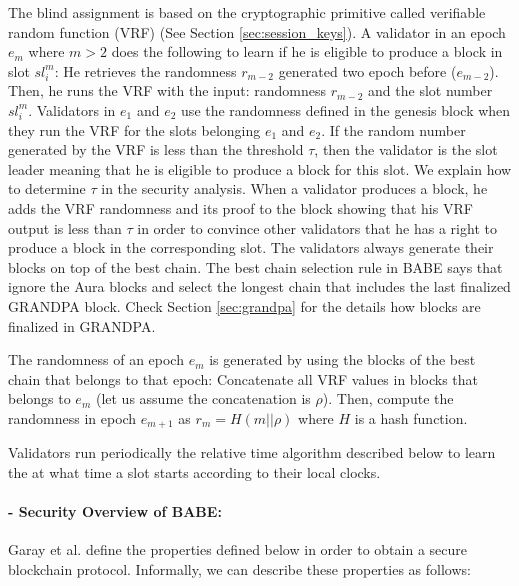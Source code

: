 The blind assignment is based on the cryptographic primitive called verifiable random function (VRF) \cite{vrf} (See Section \ref{sec:session_keys}). 
A validator in an epoch $e_m$ where $m > 2$ does the following to learn if he is eligible to produce a block in slot $sl_i^m$: He retrieves the randomness $r_{m-2}$ generated two epoch before ($e_{m-2}$). Then, he runs the VRF with the input:  randomness $r_{m-2}$ and the slot number $ sl_i^m $.  Validators in $e_1$ and $e_2$ use the randomness defined in the genesis block when they run the VRF for the slots belonging $e_1$ and $e_2$. If the random number generated by the VRF is less than the threshold $ \tau $, then the validator is the slot leader meaning that he is eligible to produce a block for this slot. We explain how to determine $\tau$ in the security analysis. 
When a validator produces a block, he adds the VRF randomness and its proof to the block showing that his VRF output is less than $\tau$  in order to convince other validators that he has a right to produce a block in the corresponding slot. The validators always generate their blocks on top of the best chain.
The best chain selection rule in BABE says that ignore the Aura blocks and select the longest chain that includes the last finalized GRANDPA block. Check Section \ref{sec:grandpa} for the details how blocks are finalized in GRANDPA. 

The randomness of an epoch $e_m$ is generated by using the blocks of the best chain that belongs to that epoch: Concatenate all  VRF values in blocks that belongs to $e_m$  (let us assume  the concatenation is \(\rho\)). Then, compute the randomness in epoch $e_{m+1}$ as $r_{m} = H(m
||\rho)$ where $ H $ is a hash function. 

Validators run periodically the relative time algorithm described below to learn the at what time a slot starts according to their local clocks.




\paragraph{- Security Overview of BABE:} Garay et al. \cite{backbone} define the properties defined below in order to obtain a secure blockchain protocol. Informally, we can describe these properties as follows:

